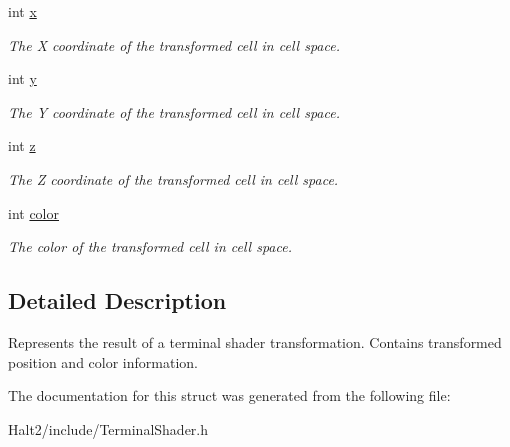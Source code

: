 \begin{DoxyCompactItemize}
\item 
\hypertarget{structhalt_1_1_terminal_shader_output_a043a1c6ef80cbe4bb0db7404d6cc665f}{int \hyperlink{structhalt_1_1_terminal_shader_output_a043a1c6ef80cbe4bb0db7404d6cc665f}{x}}\label{structhalt_1_1_terminal_shader_output_a043a1c6ef80cbe4bb0db7404d6cc665f}

\begin{DoxyCompactList}\small\item\em \-The \-X coordinate of the transformed cell in cell space. \end{DoxyCompactList}\item 
\hypertarget{structhalt_1_1_terminal_shader_output_aa2c28ce8e1d82257f7103be8c2fec583}{int \hyperlink{structhalt_1_1_terminal_shader_output_aa2c28ce8e1d82257f7103be8c2fec583}{y}}\label{structhalt_1_1_terminal_shader_output_aa2c28ce8e1d82257f7103be8c2fec583}

\begin{DoxyCompactList}\small\item\em \-The \-Y coordinate of the transformed cell in cell space. \end{DoxyCompactList}\item 
\hypertarget{structhalt_1_1_terminal_shader_output_aee403fbcffd2e8a040e43ea83070a7ff}{int \hyperlink{structhalt_1_1_terminal_shader_output_aee403fbcffd2e8a040e43ea83070a7ff}{z}}\label{structhalt_1_1_terminal_shader_output_aee403fbcffd2e8a040e43ea83070a7ff}

\begin{DoxyCompactList}\small\item\em \-The \-Z coordinate of the transformed cell in cell space. \end{DoxyCompactList}\item 
\hypertarget{structhalt_1_1_terminal_shader_output_a3c23de887b658c4ec8e6f3122f156756}{int \hyperlink{structhalt_1_1_terminal_shader_output_a3c23de887b658c4ec8e6f3122f156756}{color}}\label{structhalt_1_1_terminal_shader_output_a3c23de887b658c4ec8e6f3122f156756}

\begin{DoxyCompactList}\small\item\em \-The color of the transformed cell in cell space. \end{DoxyCompactList}\end{DoxyCompactItemize}


\subsection{\-Detailed \-Description}
\-Represents the result of a terminal shader transformation. \-Contains transformed position and color information. 

\-The documentation for this struct was generated from the following file\-:\begin{DoxyCompactItemize}
\item 
\-Halt2/include/\-Terminal\-Shader.\-h\end{DoxyCompactItemize}
